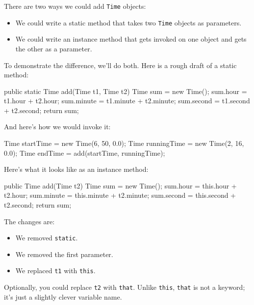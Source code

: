 \documentclass[12pt]{book}
\theoremstyle{exercise}
\newcommand{\java}[1]{\verb"#1"}
\newcommand{\java}[1]{\lstinline{#1}} %
\begin{document}
There are two ways we could add \java{Time} objects:

\begin{itemize}

\item We could write a static method that takes two \java{Time} objects as parameters.

\item We could write an instance method that gets invoked on one object and gets the other as a parameter.

\end{itemize}

To demonstrate the difference, we'll do both.
Here is a rough draft of a static method:

\begin{code}
    public static Time add(Time t1, Time t2) {
        Time sum = new Time();
        sum.hour = t1.hour + t2.hour;
        sum.minute = t1.minute + t2.minute;
        sum.second = t1.second + t2.second;
        return sum;
    }
\end{code}

And here's how we would invoke it:

\begin{code}
    Time startTime = new Time(6, 50, 0.0);
    Time runningTime = new Time(2, 16, 0.0);
    Time endTime = add(startTime, runningTime);
\end{code}

Here's what it looks like as an instance method:

\begin{code}
    public Time add(Time t2) {
        Time sum = new Time();
        sum.hour = this.hour + t2.hour;
        sum.minute = this.minute + t2.minute;
        sum.second = this.second + t2.second;
        return sum;
    }
\end{code}

The changes are:

\begin{itemize}

\item We removed \java{static}.

\item We removed the first parameter.

\item We replaced \java{t1} with \java{this}.

\end{itemize}

Optionally, you could replace \java{t2} with \java{that}.
Unlike \java{this}, \java{that} is not a keyword; it's just a slightly clever variable name.
\end{document}
